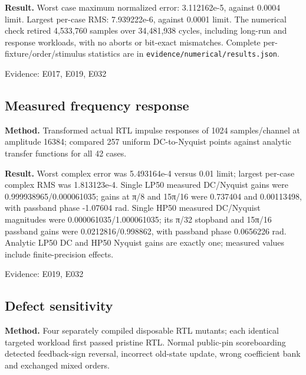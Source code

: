 \documentclass[11pt,a4paper]{article}
\begin{document}
\textbf{Result.} Worst case maximum normalized error: 3.112162e-5,\allowbreak{} against 0.0004 limit. Largest per-case RMS: 7.939222e-6,\allowbreak{} against 0.0001 limit. The numerical check retired 4,\allowbreak{}533,\allowbreak{}760 samples over 34,\allowbreak{}481,\allowbreak{}938 cycles,\allowbreak{} including long-run and response workloads,\allowbreak{} with no aborts or bit-exact mismatches. Complete per-fixture/\allowbreak{}order/\allowbreak{}stimulus statistics are in \texttt{evidence/\allowbreak{}numerical/\allowbreak{}results.json}.

{\small Evidence: E017,\allowbreak{} E019,\allowbreak{} E032}

\subsection{Measured frequency response}

\textbf{Method.} Transformed actual RTL impulse responses of 1024 samples/\allowbreak{}channel at amplitude 16384; compared 257 uniform DC-to-Nyquist points against analytic transfer functions for all 42 cases.

\textbf{Result.} Worst complex error was 5.493164e-4 versus 0.01 limit; largest per-case complex RMS was 1.813123e-4. Single LP50 measured DC/\allowbreak{}Nyquist gains were 0.999938965/\allowbreak{}0.000061035; gains at π/\allowbreak{}8 and 15π/\allowbreak{}16 were 0.737404 and 0.00113498,\allowbreak{} with passband phase -1.07604 rad. Single HP50 measured DC/\allowbreak{}Nyquist magnitudes were 0.000061035/\allowbreak{}1.000061035; its π/\allowbreak{}32 stopband and 15π/\allowbreak{}16 passband gains were 0.0212816/\allowbreak{}0.998862,\allowbreak{} with passband phase 0.0656226 rad. Analytic LP50 DC and HP50 Nyquist gains are exactly one; measured values include finite-precision effects.

{\small Evidence: E019,\allowbreak{} E032}

\subsection{Defect sensitivity}

\textbf{Method.} Four separately compiled disposable RTL mutants; each identical targeted workload first passed pristine RTL. Normal public-pin scoreboarding detected feedback-sign reversal,\allowbreak{} incorrect old-state update,\allowbreak{} wrong coefficient bank and exchanged mixed orders.
\end{document}
